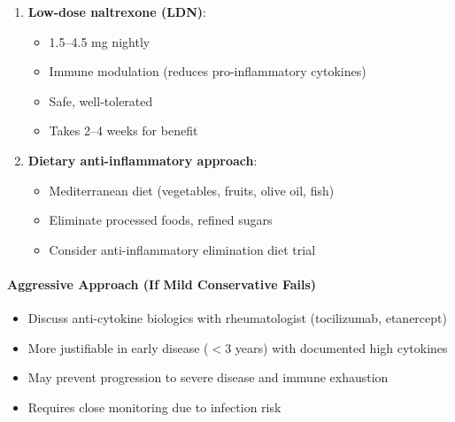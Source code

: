 \begin{enumerate}
\begin{itemize}
\begin{itemize}
            \item \textbf{Side effects}: Nausea, GI upset (take with food), jitteriness (contains some caffeine unless decaffeinated).
            \item \textbf{Drug interactions}: May interact with beta-blockers, blood thinners. Contains caffeine (unless decaffeinated).
            \item \textbf{Monitoring}: Consider baseline and 3-month liver function tests (ALT/AST) if using high-dose chronically.
        \end{itemize}
    \end{itemize}

    \item \textbf{Low-dose naltrexone (LDN)}:
    \begin{itemize}
        \item 1.5--4.5 mg nightly
        \item Immune modulation (reduces pro-inflammatory cytokines)
        \item Safe, well-tolerated
        \item Takes 2--4 weeks for benefit
    \end{itemize}

    \item \textbf{Dietary anti-inflammatory approach}:
    \begin{itemize}
        \item Mediterranean diet (vegetables, fruits, olive oil, fish)
        \item Eliminate processed foods, refined sugars
        \item Consider anti-inflammatory elimination diet trial
    \end{itemize}
\end{enumerate}

\paragraph{Aggressive Approach (If Mild Conservative Fails)}
\begin{itemize}
    \item Discuss anti-cytokine biologics with rheumatologist (tocilizumab, etanercept)
    \item More justifiable in early disease ($<$3 years) with documented high cytokines
    \item May prevent progression to severe disease and immune exhaustion
    \item Requires close monitoring due to infection risk
\end{itemize}

